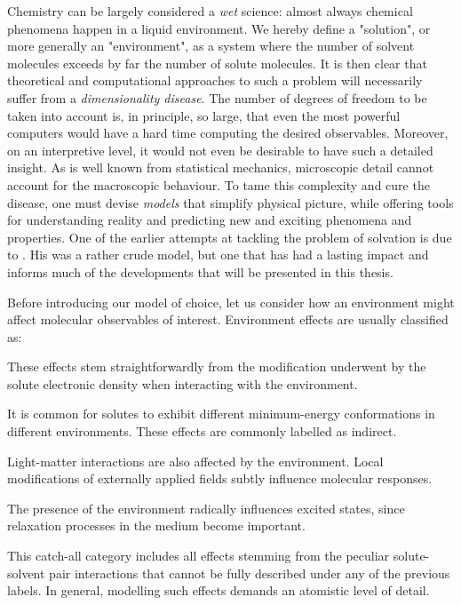 Chemistry can be largely considered a \emph{wet} science: almost always
chemical phenomena happen in a liquid environment.\autocite{Reichardt2010-le}
We hereby define a "solution", or more generally an "environment", as
a system where the number of solvent molecules exceeds by far the number
of solute molecules.\autocite{Tomasi2004-dc, Tomasi2007-es}
It is then clear that theoretical and computational approaches to such a
problem will necessarily suffer from a \emph{dimensionality disease}.
The number of degrees of freedom to be taken into account is, in
principle, so large, that even the most powerful computers
would have a hard time computing the desired observables.
Moreover, on an interpretive level, it would not even be desirable to
have such a detailed insight.
As is well known from statistical mechanics, microscopic detail cannot
account for the macroscopic behaviour.\autocite{Hill1960-ql,
Hansen2013-io}
To tame this complexity and cure the disease, one must devise
\emph{models} that simplify physical picture, while offering tools for
understanding reality and predicting new and exciting
phenomena and properties.\autocite{Anderson1972-ai, Winsberg2010-sy, Kovac2011-ew}
One of the earlier attempts at tackling the problem of solvation is due
to \citeauthor{Onsager1936-wf}. His was a rather crude model, but one
that has had a lasting impact and informs much of the developments that
will be presented in this thesis.\autocite{Onsager1936-wf}

Before introducing our model of choice, let us consider how an
environment might affect molecular observables of interest.
Environment effects are usually classified as:
\begin{description}[leftmargin=2mm, font=\normalfont\scshape]
\item[Direct.]
  These effects stem straightforwardly from the modification underwent by
  the solute electronic density when interacting with the environment.
\item[Indirect.]
  It is common for solutes to exhibit different minimum-energy
  conformations in different environments. These effects are commonly
  labelled as indirect.
\item[Local field.]
  Light-matter interactions are also affected by the environment. Local
  modifications of externally applied fields subtly influence molecular
  responses.\autocite{Cammi1998-jp, Pipolo2014-sd}
\item[Dynamic.]
  The presence of the environment radically influences excited states,
  since relaxation processes in the medium become important.
\item[Specific.] This catch-all category includes all effects
  stemming from the peculiar solute-solvent pair interactions that
  cannot be fully described under any of the previous labels.
  In general, modelling such effects demands an atomistic level of
  detail.
\end{description}

